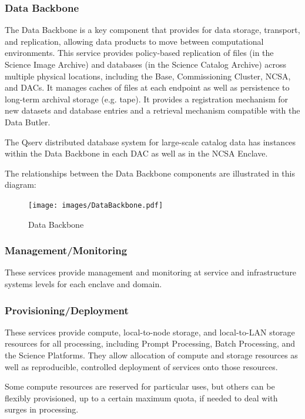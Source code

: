 \documentclass[DM,lsstdraft,toc]{lsstdoc}
\begin{document}
\subsubsection{Data Backbone}\label{data-backbone}

The Data Backbone is a key component that provides for data storage,
transport, and replication, allowing data products to move between
computational environments. This service provides policy-based
replication of files (in the Science Image Archive) and databases (in
the Science Catalog Archive) across multiple physical locations,
including the Base, Commissioning Cluster, NCSA, and DACs. It manages
caches of files at each endpoint as well as persistence to long-term
archival storage (e.g. tape). It provides a registration mechanism for
new datasets and database entries and a retrieval mechanism compatible
with the Data Butler.

The Qserv distributed database system for large-scale catalog data has
instances within the Data Backbone in each DAC as well as in the NCSA
Enclave.

The relationships between the Data Backbone components are illustrated
in this diagram:

\begin{figure}
\centering
\texttt{[image: images/DataBackbone.pdf]}
\caption{Data Backbone}
\end{figure}

\subsubsection{Management/Monitoring}\label{managementmonitoring}

These services provide management and monitoring at service and
infrastructure systems levels for each enclave and domain.

\subsubsection{Provisioning/Deployment}\label{provisioningdeployment}

These services provide compute, local-to-node storage, and local-to-LAN
storage resources for all processing, including Prompt Processing, Batch
Processing, and the Science Platforms. They allow allocation of compute
and storage resources as well as reproducible, controlled deployment of
services onto those resources.

Some compute resources are reserved for particular uses, but others can
be flexibly provisioned, up to a certain maximum quota, if needed to
deal with surges in processing.
\end{document}

